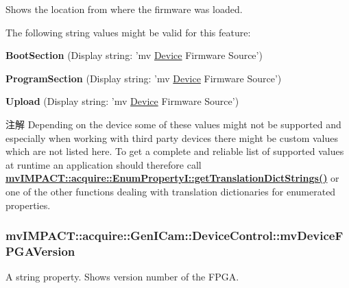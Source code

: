 Shows the location from where the firmware was loaded.

The following string values might be valid for this feature\+:
\begin{DoxyItemize}
\item {\bfseries Boot\+Section} (Display string\+: 'mv \hyperlink{classmv_i_m_p_a_c_t_1_1acquire_1_1_device}{Device} Firmware Source')
\item {\bfseries Program\+Section} (Display string\+: 'mv \hyperlink{classmv_i_m_p_a_c_t_1_1acquire_1_1_device}{Device} Firmware Source')
\item {\bfseries Upload} (Display string\+: 'mv \hyperlink{classmv_i_m_p_a_c_t_1_1acquire_1_1_device}{Device} Firmware Source')
\end{DoxyItemize}

\begin{DoxyNote}{注解}
Depending on the device some of these values might not be supported and especially when working with third party devices there might be custom values which are not listed here. To get a complete and reliable list of supported values at runtime an application should therefore call {\bfseries \hyperlink{classmv_i_m_p_a_c_t_1_1acquire_1_1_enum_property_i_a0ba6ccbf5ee69784d5d0b537924d26b6}{mv\+I\+M\+P\+A\+C\+T\+::acquire\+::\+Enum\+Property\+I\+::get\+Translation\+Dict\+Strings()}} or one of the other functions dealing with translation dictionaries for enumerated properties. 
\end{DoxyNote}
\hypertarget{classmv_i_m_p_a_c_t_1_1acquire_1_1_gen_i_cam_1_1_device_control_ac6f8194d5d7cf838ce906f2e66aff2a5}{
\subsubsection[{mv\+Device\+F\+P\+G\+A\+Version}]{ mv\+I\+M\+P\+A\+C\+T\+::acquire\+::\+Gen\+I\+Cam\+::\+Device\+Control\+::mv\+Device\+F\+P\+G\+A\+Version}}\label{classmv_i_m_p_a_c_t_1_1acquire_1_1_gen_i_cam_1_1_device_control_ac6f8194d5d7cf838ce906f2e66aff2a5}


A string property. Shows version number of the F\+P\+G\+A. 

